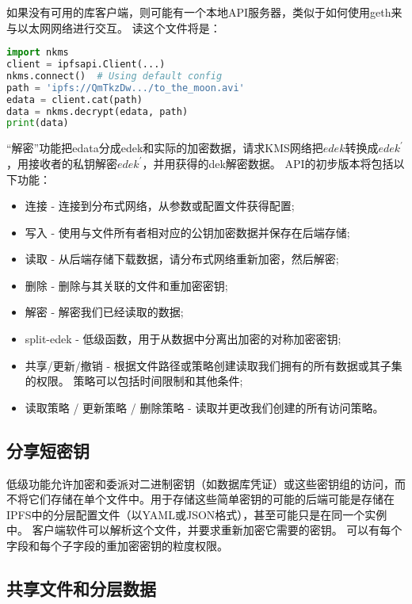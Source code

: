 \documentclass[longbibliography,nofootinbib]{revtex4-1}
\begin{document}
\begin{CJK*}{UTF8}{gbsn}
如果没有可用的库客户端，则可能有一个本地API服务器，类似于如何使用geth来与以太网网络进行交互。 读这个文件将是：

\begin{lstlisting}[frame=single,language=Python]
import nkms
client = ipfsapi.Client(...)
nkms.connect()  # Using default config
path = 'ipfs://QmTkzDw.../to_the_moon.avi'
edata = client.cat(path)
data = nkms.decrypt(edata, path)
print(data)
\end{lstlisting}

“解密”功能把edata分成edek和实际的加密数据，请求KMS网络把$edek$转换成$edek^{\prime}$，用接收者的私钥解密$edek^{\prime}$，并用获得的dek解密数据。
  API的初步版本将包括以下功能：

\begin{itemize}
    \item 连接 - 连接到分布式网络，从参数或配置文件获得配置;
    \item 写入 - 使用与文件所有者相对应的公钥加密数据并保存在后端存储;
    \item 读取 - 从后端存储下载数据，请分布式网络重新加密，然后解密;
    \item 删除 - 删除与其关联的文件和重加密密钥;
    \item 解密 - 解密我们已经读取的数据;
    \item split-edek - 低级函数，用于从数据中分离出加密的对称加密密钥;
    \item 共享/更新/撤销 - 根据文件路径或策略创建读取我们拥有的所有数据或其子集的权限。 策略可以包括时间限制和其他条件;
    \item 读取策略 / 更新策略 / 删除策略 - 读取并更改我们创建的所有访问策略。
\end{itemize}

\subsection{分享短密钥}

低级功能允许加密和委派对二进制密钥（如数据库凭证）或这些密钥组的访问，而不将它们存储在单个文件中。用于存储这些简单密钥的可能的后端可能是存储在IPFS中的分层配置文件（以YAML或JSON格式），甚至可能只是在同一个实例中。 客户端软件可以解析这个文件，并要求重新加密它需要的密钥。 可以有每个字段和每个子字段的重加密密钥的粒度权限。

\subsection{共享文件和分层数据}
\label{sec:hierarchical-data}


\end{CJK*}
\end{document}
